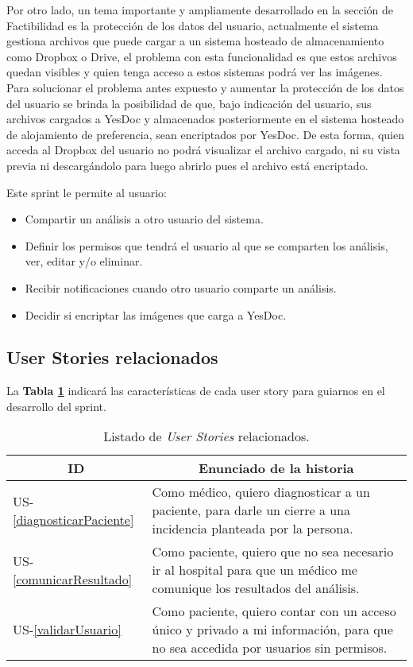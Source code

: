   Por otro lado, un tema importante y ampliamente desarrollado en la sección de Factibilidad es la protección de los datos del usuario, actualmente el sistema gestiona archivos que puede cargar a un sistema hosteado de almacenamiento como Dropbox o Drive, el problema con esta funcionalidad es que estos archivos quedan visibles y quien tenga acceso a estos sistemas podrá ver las imágenes. Para solucionar el problema antes expuesto y aumentar la protección de los datos del usuario se brinda la posibilidad de que, bajo indicación del usuario, sus archivos cargados a YesDoc y almacenados posteriormente en el sistema hosteado de alojamiento de preferencia, sean encriptados por YesDoc. De esta forma, quien acceda al Dropbox del usuario no podrá visualizar el archivo cargado, ni su vista previa ni descargándolo para luego abrirlo pues el archivo está encriptado. 

Este sprint le permite al usuario:
	\begin{itemize}
		\item Compartir un análisis a otro usuario del sistema.
		\item Definir los permisos que tendrá el usuario al que se comparten los análisis, ver, editar y/o eliminar.
		\item Recibir notificaciones cuando otro usuario comparte un análisis.  
		\item Decidir si encriptar las imágenes que carga a YesDoc.
	\end{itemize}
	
\subsection{User Stories relacionados}
La \textbf{Tabla \ref{US-Sprint8}} indicará las características de cada user story para guiarnos en el desarrollo del sprint.


\begin{table}[h]
	\centering
	\begin{tabular}{|l|p{9cm}|}
		\hline
		\multicolumn{1}{|c|}{\textbf{ID}} &
		\multicolumn{1}{|c|}{\textbf{Enunciado de la historia}} \\  
		\hline
		US-\ref{diagnosticarPaciente} &
		Como médico, quiero diagnosticar a un paciente, para darle un cierre a una incidencia planteada por la persona. \\ 
		\hline
		US-\ref{comunicarResultado} &
		Como paciente, quiero que no sea necesario ir al hospital para que un médico me comunique los resultados del análisis. \\       
		\hline
		US-\ref{validarUsuario} &
		Como paciente, quiero contar con un acceso único y privado a mi información, para que no sea accedida por usuarios sin permisos. \\
		\hline
	\end{tabular}
	\caption{Listado de \textit{User Stories} relacionados.}
	\label{US-Sprint8}
\end{table}


